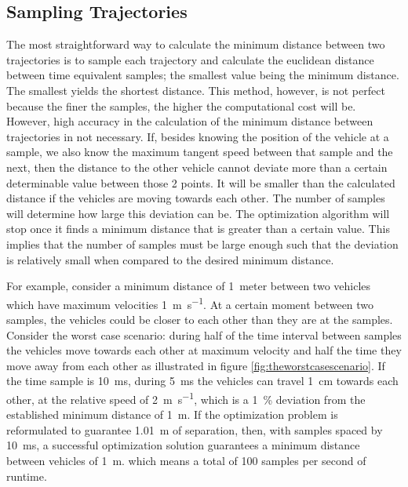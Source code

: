 \subsection{Sampling Trajectories}

\par The most straightforward way to calculate the minimum distance between two trajectories is to sample each trajectory and calculate the euclidean distance between time equivalent samples; the smallest value being the minimum distance. The smallest yields the shortest distance. This method, however, is not perfect because the finer the samples, the higher the computational cost will be. However, high accuracy in the calculation of the minimum distance between trajectories in not necessary. If, besides knowing the position of the vehicle at a sample, we also know the maximum tangent speed between that sample and the next, then the distance to the other vehicle cannot deviate more than a certain determinable value between those 2 points. It will be smaller than the calculated distance if the vehicles are moving towards each other. The number of samples will determine how large this deviation can be. The optimization algorithm will stop once it finds a minimum distance that is greater than a certain value. This implies that the number of samples must be large enough such that the deviation is relatively small when compared to the desired minimum distance. 
\par For example, consider a minimum distance of \SI{1}{meter} between two vehicles which have maximum velocities \SI{1}{\meter\per\second}. At a certain moment between two samples, the vehicles could be closer to each other than they are at the samples. Consider the worst case scenario: during half of the time interval between samples the vehicles move towards each other at maximum velocity  and half the time they move away from each other as illustrated in figure \ref{fig:theworstcasescenario}. If the time sample is \SI{10}{\milli\second}, during \SI{5}{\milli\second} the vehicles can travel \SI{1}{\centi\meter} towards each other, at the relative speed of \SI{2}{\meter\per\second}, which is a \SI{1}{\percent} deviation from the established minimum distance of \SI{1}{\meter}. If the optimization problem is reformulated to guarantee \SI{1.01}{\meter} of separation, then, with samples spaced by \SI{10}{\milli\second}, a successful optimization solution guarantees a minimum distance between vehicles of \SI{1}{\meter}. which means a total of 100 samples per second of runtime.

